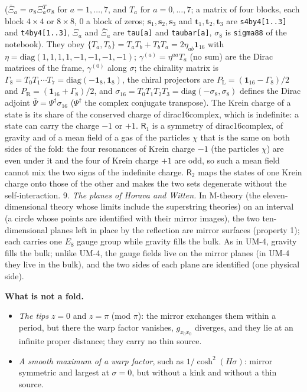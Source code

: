 \documentclass[
  10pt,
]{article}
\providecommand{\tightlist}{%
  \setlength{\itemsep}{0pt}\setlength{\parskip}{0pt}}
\begin{document}
(\(\bar\Xi_a = \sigma_8\Xi_a^T\sigma_8\) for \(a = 1, \dots, 7\), and
\(T_a\) for \(a = 0, \dots, 7\); a matrix of four blocks, each block
\(4 \times 4\) or \(8 \times 8\), 0 a block of zeros;
\(\mathbf{s}_1, \mathbf{s}_2, \mathbf{s}_3\) and
\(\mathbf{t}_1, \mathbf{t}_2, \mathbf{t}_3\) are
\texttt{s4by4{[}1..3{]}} and \texttt{t4by4{[}1..3{]}}, \(\Xi_a\) and
\(\bar\Xi_a\) are \texttt{tau{[}a{]}} and \texttt{taubar{[}a{]}},
\(\sigma_8\) is \texttt{sigma88} of the notebook). They obey
\(\{T_a, T_b\} = T_aT_b + T_bT_a = 2\eta_{ab}\mathbf{1}_{16}\) with
\(\eta = \mathrm{diag}(1, 1, 1, 1, -1, -1, -1, -1)\);
\(\gamma^{(a)} = \eta^{aa}T_a\) (no sum) are the Dirac matrices of the
frame, \(\gamma^{(0)}\) along \(\sigma\); the chirality matrix is
\(\Gamma_8 = T_0T_1\cdots T_7 =  \mathrm{diag}(-\mathbf{1}_8, \mathbf{1}_8)\),
the chiral projectors are
\(P_{\mathrm{L}} = (\mathbf{1}_{16} - \Gamma_8)/2\) and
\(P_{\mathrm{R}} = (\mathbf{1}_{16} + \Gamma_8)/2\), and
\(\sigma_{16} = T_0T_1T_2T_3 = \mathrm{diag}(-\sigma_8, \sigma_8)\)
defines the Dirac adjoint \(\bar\Psi = \Psi^\dagger\sigma_{16}\)
(\(\Psi^\dagger\) the complex conjugate transpose). The Krein charge of
a state is its share of the conserved charge of dirac16complex, which is
indefinite: a state can carry the charge \(-1\) or \(+1\).
\(\mathsf{R}_1\) is a symmetry of dirac16complex, of gravity and of a
mean field of a gas of the particles \(\chi\) that is the same on both
sides of the fold: the four resonances of Krein charge \(-1\) (the
particles \(\chi\)) are even under it and the four of Krein charge
\(+1\) are odd, so such a mean field cannot mix the two signs of the
indefinite charge. \(\mathsf{R}_2\) maps the states of one Krein charge
onto those of the other and makes the two sets degenerate without the
self-interaction. 9. \emph{The planes of Horava and Witten.} In M-theory
(the eleven-dimensional theory whose limits include the superstring
theories) on an interval (a circle whose points are identified with
their mirror images), the two ten-dimensional planes left in place by
the reflection are mirror surfaces (property 1); each carries one
\(E_8\) gauge group while gravity fills the bulk. As in UM-4, gravity
fills the bulk; unlike UM-4, the gauge fields live on the mirror planes
(in UM-4 they live in the bulk), and the two sides of each plane are
identified (one physical side).

\textbf{What is not a fold.}

\begin{itemize}
\tightlist
\item
  \emph{The tips} \(z = 0\) and \(z = \pi\) (mod \(\pi\)): the mirror
  exchanges them within a period, but there the warp factor vanishes,
  \(g_{x_0x_0}\) diverges, and they lie at an infinite proper distance;
  they carry no thin source.
\item
  \emph{A smooth maximum of a warp factor}, such as
  \(1/\cosh^2(H\sigma)\): mirror symmetric and largest at
  \(\sigma = 0\), but without a kink and without a thin source.
\end{itemize}
\end{document}
